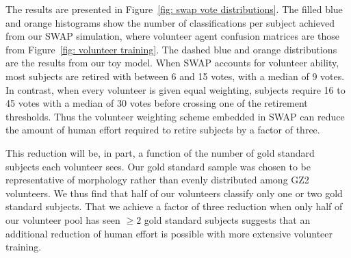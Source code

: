 The results are presented in Figure~\ref{fig: swap vote distributions}. The filled blue and orange histograms show the number of classifications per subject achieved from our SWAP simulation, where volunteer agent confusion matrices are those from Figure~\ref{fig: volunteer training}. The dashed blue and orange distributions are the results from our toy model. When SWAP accounts for volunteer ability, most subjects are retired with between 6 and 15 votes, with a median of 9 votes. In contrast, when every volunteer is given equal weighting, subjects require 16 to 45 votes with a median of 30 votes before crossing one of the retirement thresholds. Thus the volunteer weighting scheme embedded in SWAP can reduce the amount of human effort required to retire subjects by a factor of three.

This reduction will be, in part, a function of the number of gold standard subjects each volunteer sees.  Our gold standard sample was chosen to be representative of morphology rather than evenly distributed among GZ2 volunteers. We thus find that half of our volunteers classify only one or two gold standard subjects. That we achieve a factor of three reduction when only half of our volunteer pool has seen $\ge 2$ gold standard subjects suggests that an additional reduction of  human effort is possible with more extensive volunteer training.

